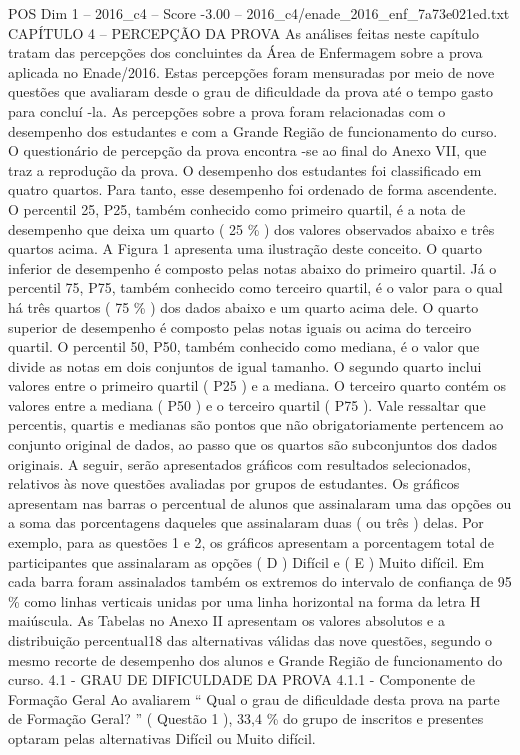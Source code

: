 \begin{textsample}{POS Dim 1 – 2016\_c4 – Score -3.00 – 2016\_c4/enade\_2016\_enf\_7a73e021ed.txt}  \label{ex:f1_pos_283}
CAPÍTULO 4 – PERCEPÇÃO DA PROVA As análises feitas neste capítulo tratam das percepções dos concluintes da Área de Enfermagem sobre a prova aplicada no Enade/2016.
Estas percepções foram mensuradas por meio de nove questões que avaliaram desde o grau de dificuldade da prova até o tempo gasto para concluí -la.
As percepções sobre a prova foram relacionadas com o desempenho dos estudantes e com a Grande Região de funcionamento do curso.
O questionário de percepção da prova encontra -se ao final do Anexo VII, que traz a reprodução da prova.
O desempenho dos estudantes foi classificado em quatro quartos.
Para tanto, esse desempenho foi ordenado de forma ascendente.
O percentil 25, P25, também conhecido como primeiro quartil, é a nota de desempenho que deixa um quarto ( 25 \% ) dos valores observados abaixo e três quartos acima.
A Figura 1 apresenta uma ilustração deste conceito.
O quarto inferior de desempenho é composto pelas notas abaixo do primeiro quartil.
Já o percentil 75, P75, também conhecido como terceiro quartil, é o valor para o qual há três quartos ( 75 \% ) dos dados abaixo e um quarto acima dele.
O quarto superior de desempenho é composto pelas notas iguais ou acima do terceiro quartil.
O percentil 50, P50, também conhecido como mediana, é o valor que divide as notas em dois conjuntos de igual tamanho.
O segundo quarto inclui valores entre o primeiro quartil ( P25 ) e a mediana.
O terceiro quarto contém os valores entre a mediana ( P50 ) e o terceiro quartil ( P75 ).
Vale ressaltar que percentis, quartis e medianas são pontos que não obrigatoriamente pertencem ao conjunto original de dados, ao passo que os quartos são subconjuntos dos dados originais.
A seguir, serão apresentados gráficos com resultados selecionados, relativos às nove questões avaliadas por grupos de estudantes.
Os gráficos apresentam nas barras o percentual de alunos que assinalaram uma das opções ou a soma das porcentagens daqueles que assinalaram duas ( ou três ) delas.
Por exemplo, para as questões 1 e 2, os gráficos apresentam a porcentagem total de participantes que assinalaram as opções ( D ) Difícil e ( E ) Muito difícil.
Em cada barra foram assinalados também os extremos do intervalo de confiança de 95 \% como linhas verticais unidas por uma linha horizontal na forma da letra H maiúscula.
As Tabelas no Anexo II apresentam os valores absolutos e a distribuição percentual18 das alternativas válidas das nove questões, segundo o mesmo recorte de desempenho dos alunos e Grande Região de funcionamento do curso. 4.1 - GRAU DE DIFICULDADE DA PROVA 4.1.1 - Componente de Formação Geral Ao avaliarem “ Qual o grau de dificuldade desta prova na parte de Formação Geral? ” ( Questão 1 ), 33,4 \% do grupo de inscritos e presentes optaram pelas alternativas Difícil ou Muito difícil.

\end{textsample}
